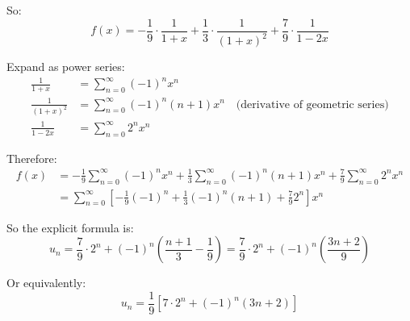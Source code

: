 \documentclass[12pt]{article}
\begin{document}
\begin{answerbox}
\begin{enumerate}
    So:
    \[
    f(x) = -\frac{1}{9}\cdot\frac{1}{1+x} + \frac{1}{3}\cdot\frac{1}{(1+x)^2} + \frac{7}{9}\cdot\frac{1}{1-2x}
    \]
    
    Expand as power series:
    \begin{align*}
    \frac{1}{1+x} &= \sum_{n=0}^{\infty} (-1)^n x^n \\
    \frac{1}{(1+x)^2} &= \sum_{n=0}^{\infty} (-1)^n (n+1) x^n \quad \text{(derivative of geometric series)} \\
    \frac{1}{1-2x} &= \sum_{n=0}^{\infty} 2^n x^n
    \end{align*}
    
    Therefore:
    \begin{align*}
    f(x) &= -\frac{1}{9} \sum_{n=0}^{\infty} (-1)^n x^n + \frac{1}{3} \sum_{n=0}^{\infty} (-1)^n (n+1) x^n + \frac{7}{9} \sum_{n=0}^{\infty} 2^n x^n \\
    &= \sum_{n=0}^{\infty} \left[ -\frac{1}{9}(-1)^n + \frac{1}{3}(-1)^n (n+1) + \frac{7}{9} 2^n \right] x^n
    \end{align*}
    
    So the explicit formula is:
    \[
    u_n = \frac{7}{9} \cdot 2^n + (-1)^n \left( \frac{n+1}{3} - \frac{1}{9} \right) = \frac{7}{9} \cdot 2^n + (-1)^n \left( \frac{3n+2}{9} \right)
    \]
    
    Or equivalently:
    \[
    u_n = \frac{1}{9} \left[ 7 \cdot 2^n + (-1)^n (3n+2) \right]
    \]
\end{enumerate}
\end{answerbox}

\end{document}
